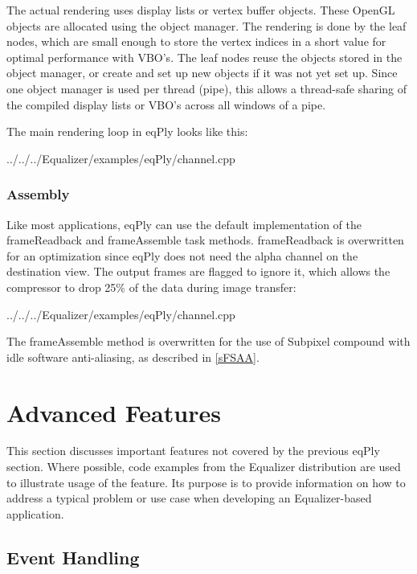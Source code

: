 \documentclass[10pt,a4]{scrartcl}
\begin{document}
The actual rendering uses display lists or vertex buffer objects. These
OpenGL objects are allocated using the object manager. The rendering is
done by the leaf nodes, which are small enough to store the vertex
indices in a \textsf{short} value for optimal performance with VBO's.
The leaf nodes reuse the objects stored in the object manager, or create
and set up new objects if it was not yet set up. Since one object
manager is used per thread (pipe), this allows a thread-safe sharing of
the compiled display lists or VBO's across all windows of a pipe.

The main rendering loop in \textsf{eqPly} looks like this:

{\footnotesize
  {../../../Equalizer/examples/eqPly/channel.cpp}}

\subsubsection{Assembly}

Like most applications, eqPly can use the default implementation of the
\textsf{frameReadback} and \textsf{frameAssemble} task methods.
\textsf{frameReadback} is overwritten for an optimization since eqPly
does not need the alpha channel on the destination view.
The output frames are flagged to ignore it, which allows the compressor to
drop 25\% of the data during image transfer:

{\footnotesize
  {../../../Equalizer/examples/eqPly/channel.cpp}}

The \textsf{frameAssemble} method is overwritten for the use of Subpixel
compound with idle software anti-aliasing, as described in \ref{sFSAA}.



\section{Advanced Features}

This section discusses important features not covered by the previous
\textsf{eqPly} section. Where possible, code examples from the Equalizer
distribution are used to illustrate usage of the feature. Its
purpose is to provide information on how to address a typical problem or
use case when developing an Equalizer-based application.


\subsection{\label{sEventHandling}Event Handling}
\end{document}
